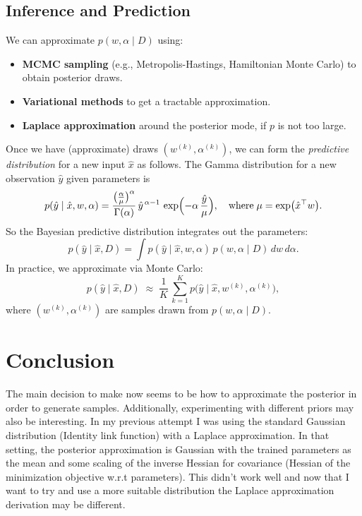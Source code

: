 \documentclass{article}
\begin{document}
\subsection{Inference and Prediction}

We can approximate $p(w,\alpha \mid D)$ using:
\begin{itemize}
\item \textbf{MCMC sampling} (e.g., Metropolis-Hastings, Hamiltonian Monte Carlo) to obtain posterior draws.
\item \textbf{Variational methods} to get a tractable approximation.
\item \textbf{Laplace approximation} around the posterior mode, if $p$ is not too large. 
\end{itemize}

Once we have (approximate) draws $(w^{(k)},\alpha^{(k)})$, we can form the \emph{predictive distribution} for a new input $\hat{x}$ as follows. The Gamma distribution for a new observation $\hat{y}$ given parameters is
\[
p(\hat{y} \mid \hat{x}, w,\alpha)
= \frac{\bigl(\frac{\alpha}{\mu}\bigr)^{\alpha}}{\Gamma(\alpha)}
\, \hat{y}^{\,\alpha -1}\,
\exp\Bigl(- \alpha\,\frac{\hat{y}}{\mu}\Bigr),
\quad
\text{where}\;\mu = \exp\bigl(\hat{x}^\top w\bigr).
\]
So the Bayesian predictive distribution integrates out the parameters:
\[
p(\hat{y} \mid \hat{x}, D)
= \int p(\hat{y} \mid \hat{x}, w,\alpha)\,p(w,\alpha \mid D)\,dw\,d\alpha.
\]
In practice, we approximate via Monte Carlo:
\[
p(\hat{y} \mid \hat{x}, D)
\;\approx\;
\frac{1}{K}\,\sum_{k=1}^K 
p\bigl(\hat{y} \mid \hat{x}, w^{(k)},\alpha^{(k)}\bigr),
\]
where $(w^{(k)},\alpha^{(k)})$ are samples drawn from $p(w,\alpha \mid D)$. 

\section{Conclusion}

The main decision to make now seems to be how to approximate the posterior in order to generate samples. Additionally, experimenting with different priors may also be interesting. In my previous attempt I was using the standard Gaussian distribution (Identity link function) with a Laplace approximation. In that setting, the posterior approximation is Gaussian with the trained parameters as the mean and some scaling of the inverse Hessian for covariance (Hessian of the minimization objective w.r.t parameters). This didn't work well and now that I want to try and use a more suitable distribution the Laplace approximation derivation may be different.
\end{document}
